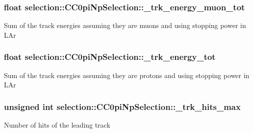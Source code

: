 \subsubsection[{\texorpdfstring{\+\_\+trk\+\_\+energy\+\_\+muon\+\_\+tot}{_trk_energy_muon_tot}}]{\setlength{\rightskip}{0pt plus 5cm}float selection\+::\+C\+C0pi\+Np\+Selection\+::\+\_\+trk\+\_\+energy\+\_\+muon\+\_\+tot\hspace{0.3cm}{\ttfamily [private]}}\hypertarget{classselection_1_1CC0piNpSelection_aebac9c09110d469f5d7ed3817c33e437}{}\label{classselection_1_1CC0piNpSelection_aebac9c09110d469f5d7ed3817c33e437}
Sum of the track energies assuming they are muons and using stopping power in L\+Ar 
\subsubsection[{\texorpdfstring{\+\_\+trk\+\_\+energy\+\_\+tot}{_trk_energy_tot}}]{\setlength{\rightskip}{0pt plus 5cm}float selection\+::\+C\+C0pi\+Np\+Selection\+::\+\_\+trk\+\_\+energy\+\_\+tot\hspace{0.3cm}{\ttfamily [private]}}\hypertarget{classselection_1_1CC0piNpSelection_a8a0da0081e2f182880249debba6551e3}{}\label{classselection_1_1CC0piNpSelection_a8a0da0081e2f182880249debba6551e3}
Sum of the track energies assuming they are protons and using stopping power in L\+Ar 
\subsubsection[{\texorpdfstring{\+\_\+trk\+\_\+hits\+\_\+max}{_trk_hits_max}}]{\setlength{\rightskip}{0pt plus 5cm}unsigned int selection\+::\+C\+C0pi\+Np\+Selection\+::\+\_\+trk\+\_\+hits\+\_\+max\hspace{0.3cm}{\ttfamily [private]}}\hypertarget{classselection_1_1CC0piNpSelection_a247d186cb641d28f8ea5b02c4f2a39bc}{}\label{classselection_1_1CC0piNpSelection_a247d186cb641d28f8ea5b02c4f2a39bc}
Number of hits of the leading track 
